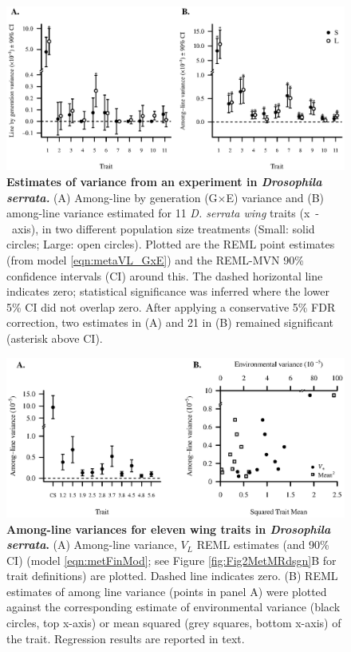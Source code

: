 \FloatBarrier
\newpage
\begin{figure}
    \centering
    \includegraphics{Chp2_Meta/Fig7_GxE.eps}
    \caption[Estimates of variance from an experiment in \textit{Drosophila serrata.}]{\textbf{Estimates of variance from an experiment in \textit{Drosophila serrata.}} (A) Among-line by generation (G$\times$E) variance and (B) among-line variance estimated for 11 \textit{D. serrata wing} traits (x~-~axis), in two different population size treatments (Small: solid circles; Large: open circles). Plotted are the REML point estimates (from model \ref{eqn:metaVL_GxE}) and the REML-MVN 90\% confidence intervals (CI) around this. The dashed horizontal line indicates zero; statistical significance was inferred where the lower 5\% CI did not overlap zero. After applying a conservative 5\% FDR correction, two estimates in (A) and 21 in (B) remained significant (asterisk above CI).}
    \label{fig:7_GxE}
\end{figure}

\begin{figure}
    \centering
    \includegraphics{Chp2_Meta/elevenVlvsMeanSqdorVE.eps}
    \caption[Among-line variances for eleven wing traits in \textit{Drosophila serrata}.]{\textbf{Among-line variances for eleven wing traits in \textit{Drosophila serrata}.} (A) Among-line variance, $V_L$ REML estimates (and 90\% CI) (model \ref{eqn:metFinMod}; see Figure \ref{fig:Fig2MetMRdsgn}B for trait definitions) are plotted. Dashed line indicates zero. (B) REML estimates of among line variance (points in panel A) were plotted against the corresponding estimate of environmental variance (black circles, top x-axis) or mean squared (grey squares, bottom x-axis) of the trait. Regression results are reported in text.}
    \label{fig:8ElevenVL}
\end{figure}


